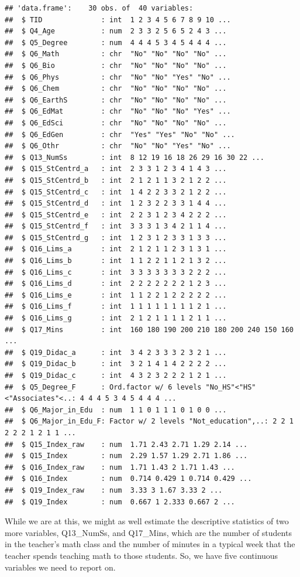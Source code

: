\documentclass[
]{article}
\begin{document}
\begin{verbatim}
## 'data.frame':    30 obs. of  40 variables:
##  $ TID              : int  1 2 3 4 5 6 7 8 9 10 ...
##  $ Q4_Age           : num  2 3 3 2 5 6 5 2 4 3 ...
##  $ Q5_Degree        : num  4 4 4 5 3 4 5 4 4 4 ...
##  $ Q6_Math          : chr  "No" "No" "No" "No" ...
##  $ Q6_Bio           : chr  "No" "No" "No" "No" ...
##  $ Q6_Phys          : chr  "No" "No" "Yes" "No" ...
##  $ Q6_Chem          : chr  "No" "No" "No" "No" ...
##  $ Q6_EarthS        : chr  "No" "No" "No" "No" ...
##  $ Q6_EdMat         : chr  "No" "No" "No" "Yes" ...
##  $ Q6_EdSci         : chr  "No" "No" "No" "No" ...
##  $ Q6_EdGen         : chr  "Yes" "Yes" "No" "No" ...
##  $ Q6_Othr          : chr  "No" "No" "Yes" "No" ...
##  $ Q13_NumSs        : int  8 12 19 16 18 26 29 16 30 22 ...
##  $ Q15_StCentrd_a   : int  2 3 3 1 2 3 4 1 4 3 ...
##  $ Q15_StCentrd_b   : int  2 1 2 1 1 3 2 1 2 2 ...
##  $ Q15_StCentrd_c   : int  1 4 2 2 3 3 2 1 2 2 ...
##  $ Q15_StCentrd_d   : int  1 2 3 2 2 3 3 1 4 4 ...
##  $ Q15_StCentrd_e   : int  2 2 3 1 2 3 4 2 2 2 ...
##  $ Q15_StCentrd_f   : int  3 3 3 1 3 4 2 1 1 4 ...
##  $ Q15_StCentrd_g   : int  1 2 3 1 2 3 3 1 3 3 ...
##  $ Q16_Lims_a       : int  2 1 2 1 1 2 3 1 3 1 ...
##  $ Q16_Lims_b       : int  1 1 2 2 1 1 2 1 3 2 ...
##  $ Q16_Lims_c       : int  3 3 3 3 3 3 3 2 2 2 ...
##  $ Q16_Lims_d       : int  2 2 2 2 2 2 2 1 2 3 ...
##  $ Q16_Lims_e       : int  1 1 2 2 1 2 2 2 2 2 ...
##  $ Q16_Lims_f       : int  1 1 1 1 1 1 1 1 2 1 ...
##  $ Q16_Lims_g       : int  2 1 2 1 1 1 1 2 1 1 ...
##  $ Q17_Mins         : int  160 180 190 200 210 180 200 240 150 160 ...
##  $ Q19_Didac_a      : int  3 4 2 3 3 3 2 3 2 1 ...
##  $ Q19_Didac_b      : int  3 2 1 4 1 4 2 2 2 2 ...
##  $ Q19_Didac_c      : int  4 3 2 3 2 2 2 1 2 1 ...
##  $ Q5_Degree_F      : Ord.factor w/ 6 levels "No_HS"<"HS"<"Associates"<..: 4 4 4 5 3 4 5 4 4 4 ...
##  $ Q6_Major_in_Edu  : num  1 1 0 1 1 1 0 1 0 0 ...
##  $ Q6_Major_in_Edu_F: Factor w/ 2 levels "Not_education",..: 2 2 1 2 2 2 1 2 1 1 ...
##  $ Q15_Index_raw    : num  1.71 2.43 2.71 1.29 2.14 ...
##  $ Q15_Index        : num  2.29 1.57 1.29 2.71 1.86 ...
##  $ Q16_Index_raw    : num  1.71 1.43 2 1.71 1.43 ...
##  $ Q16_Index        : num  0.714 0.429 1 0.714 0.429 ...
##  $ Q19_Index_raw    : num  3.33 3 1.67 3.33 2 ...
##  $ Q19_Index        : num  0.667 1 2.333 0.667 2 ...
\end{verbatim}

While we are at this, we might as well estimate the descriptive statistics of two more variables, Q13\_NumSs, and Q17\_Mins, which are the number of students in the teacher's math class and the number of minutes in a typical week that the teacher spends teaching math to those students. So, we have five continuous variables we need to report on.
\end{document}
